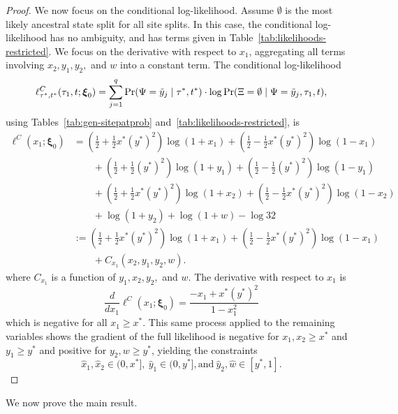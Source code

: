 \begin{proof}
We now focus on the conditional log-likelihood.
Assume $\emptyset$ is the most likely ancestral state split for all site splits.
In this case, the conditional log-likelihood has no ambiguity, and has terms given in Table~\ref{tab:likelihoods-restricted}.
We focus on the derivative with respect to $x_1$, aggregating all terms involving $x_2,y_1,y_2,$ and $w$ into a constant term.
The conditional log-likelihood
\[
\ell^C_{\tau^*,t^*}(\tau_1, t; \boldsymbol\xi_0) = \sum_{j=1}^q \Pr(\Psi=\tilde{y}_j \mid \tau^*, t^*)\cdot\log \Pr(\Xi=\emptyset \mid \Psi = \tilde{y}_j, \tau_1, t),
\]
using Tables~\ref{tab:gen-sitepatprob} and~\ref{tab:likelihoods-restricted}, is
\begin{align*}
\ell^C(x_1; \boldsymbol\xi_0) &= \left(\frac{1}{2}+\frac{1}{2}x^*(y^*)^2\right)\log(1+x_1) + \left(\frac{1}{2}-\frac{1}{2}x^*(y^*)^2\right)\log(1-x_1)\\
&\qquad + \left(\frac{1}{2}+\frac{1}{2}(y^*)^2\right)\log(1+y_1) + \left(\frac{1}{2}-\frac{1}{2}(y^*)^2\right)\log(1-y_1)\\
&\qquad + \left(\frac{1}{2}+\frac{1}{2}x^*(y^*)^2\right)\log(1+x_2) + \left(\frac{1}{2}-\frac{1}{2}x^*(y^*)^2\right)\log(1-x_2)\\
&\qquad + \log(1+y_2) + \log(1+w) - \log 32\\
&:= \left(\frac{1}{2}+\frac{1}{2}x^*(y^*)^2\right)\log(1+x_1) + \left(\frac{1}{2}-\frac{1}{2}x^*(y^*)^2\right)\log(1-x_1)\\
&\qquad + C_{x_1}(x_2,y_1,y_2,w).
\end{align*}
where $C_{x_1}$ is a function of $y_1,x_2,y_2,$ and $w$.
The derivative with respect to $x_1$ is
\[
\frac{d}{dx_1} \ell^C(x_1; \boldsymbol\xi_0) = \frac{-x_1+x^*(y^*)^2}{1-x_1^2}
\]
which is negative for all $x_1 \ge x^*$.
This same process applied to the remaining variables shows the gradient of the full likelihood is negative for $x_1,x_2 \ge x^*$ and $y_1 \ge y^*$ and positive for $y_2,w \ge y^*$, yielding the constraints
\[
\hat{x}_1,\hat{x}_2 \in (0, x^*], \ \hat{y}_1 \in (0, y^*], \text{and}\ \hat{y}_2,\hat{w} \in [y^*, 1].
\]
\end{proof}

We now prove the main result.

\topoInconsist*

